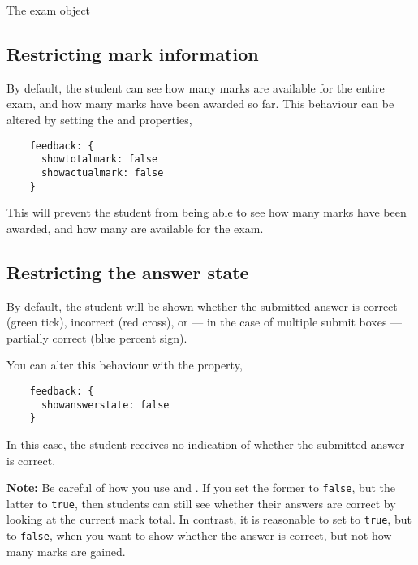 \begin{chapter}{\label{cha:exam_object}The exam object}
  \subsection{Restricting mark information}
  By default, the student can see how many marks are available for the entire
  exam, and how many marks have been awarded so far.  This behaviour can be
  altered by setting the  and 
  properties, \eg
  \begin{Verbatim}
    feedback: {
      showtotalmark: false
      showactualmark: false
    }
  \end{Verbatim}
  This will prevent the student from being able to see how many marks have been
  awarded, and how many are available for the exam.

  \subsection{Restricting the answer state}
  By default, the student will be shown whether the submitted answer is correct
  (green tick), incorrect (red cross), or --- in the case of multiple submit
  boxes --- partially correct (blue percent sign).

  You can alter this behaviour with the  property,
  \eg
  \begin{Verbatim}
    feedback: {
      showanswerstate: false
    }
  \end{Verbatim}
  In this case, the student receives no indication of whether the submitted
  answer is correct.

  \textbf{Note:} Be careful of how you use  and
  .  If you set the former to \verb"false", but the
  latter to \verb"true", then students can still see whether their answers are
  correct by looking at the current mark total.  In contrast, it is reasonable
  to set  to \verb"true", but
   to \verb"false", when you want to show whether the
  answer is correct, but not how many marks are gained.


\end{chapter}
